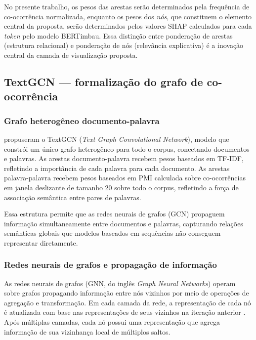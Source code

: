 \documentclass[
    12pt,                %
    openright,           %
    oneside,             %
    a4paper,             %
    english,             %
    brazil               %
]{abntex2}
\begin{document}
No presente trabalho, os pesos das arestas serão determinados pela frequência de co-ocorrência normalizada, enquanto os pesos dos \textit{nós}, que constituem o elemento central da proposta, serão determinados pelos valores SHAP calculados para cada \textit{token} pelo modelo BERTimbau. Essa distinção entre ponderação de arestas (estrutura relacional) e ponderação de nós (relevância explicativa) é a inovação central da camada de visualização proposta.

\subsection{TextGCN — formalização do grafo de co-ocorrência}
\label{subsec:textgcn}

\subsubsection{Grafo heterogêneo documento-palavra}
\label{subsubsec:textgcn_grafo}

 propuseram o TextGCN (\textit{Text Graph Convolutional Network}), modelo que constrói um único grafo heterogêneo para todo o corpus, conectando documentos e palavras. As arestas documento-palavra recebem pesos baseados em TF-IDF, refletindo a importância de cada palavra para cada documento. As arestas palavra-palavra recebem pesos baseados em PMI calculada sobre co-ocorrências em janela deslizante de tamanho 20 sobre todo o corpus, refletindo a força de associação semântica entre pares de palavras.

Essa estrutura permite que as redes neurais de grafos (GCN) propaguem informação simultaneamente entre documentos e palavras, capturando relações semânticas globais que modelos baseados em sequências não conseguem representar diretamente.

\subsubsection{Redes neurais de grafos e propagação de informação}
\label{subsubsec:textgcn_gcn}

As redes neurais de grafos (GNN, do inglês \textit{Graph Neural Networks}) operam sobre grafos propagando informação entre nós vizinhos por meio de operações de agregação e transformação. Em cada camada da rede, a representação de cada nó é atualizada com base nas representações de seus vizinhos na iteração anterior \cite{yao2019}. Após múltiplas camadas, cada nó possui uma representação que agrega informação de sua vizinhança local de múltiplos saltos.
\end{document}
